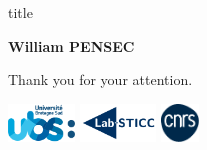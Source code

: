 \begin{frame}
    \centering

    \vfill
    \begin{beamercolorbox}[sep=8pt,center,shadow=true,rounded=true]{title}
        \NoHyper\large\inserttitle\par\endNoHyper
        \vspace{.5cm}
        \NoHyper\large\insertsubtitle\par\endNoHyper
    \end{beamercolorbox}
    \vfill

    \large \textbf{William PENSEC}

    \vfill

    \Large Thank you for your attention.

    \vfill
    \includegraphics[height=1cm]{img/logo/ubs.png}
    \hspace{1cm}
    \includegraphics[height=1cm]{img/logo/labsticc.pdf}
    \hspace{1cm}
    \includegraphics[height=1cm]{img/logo/cnrs.pdf}
\end{frame}
